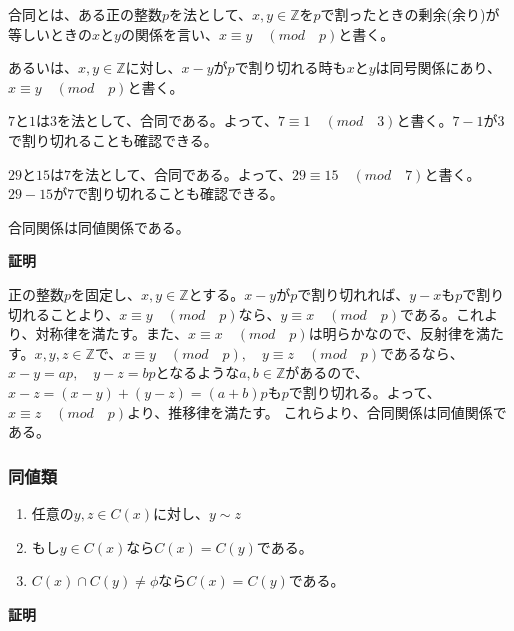 \documentclass[dvipdfmx,autodetect-engine]{jsarticle}
\begin{document}
合同とは、ある正の整数$p$を法として、$x,y \in \mathbb{Z}$を$p$で割ったときの剰余(余り)が等しいときの$x$と$y$の関係を言い、$x \equiv y \quad (mod \quad p)$と書く。

あるいは、$x, y \in \mathbb{Z}$に対し、$x - y$が$p$で割り切れる時も$x$と$y$は同号関係にあり、$x \equiv y \quad (mod \quad p)$と書く。

\exam $7$と$1$は$3$を法として、合同である。よって、$7 \equiv 1 \quad (mod \quad 3)$と書く。$7 - 1$が$3$で割り切れることも確認できる。

\exam $29$と$15$は$7$を法として、合同である。よって、$29 \equiv 15 \quad (mod \quad 7)$と書く。$29 - 15$が$7$で割り切れることも確認できる。

\prop 合同関係は同値関係である。

{\bf 証明}

正の整数$p$を固定し、$x, y \in \mathbb{Z}$とする。$x - y$が$p$で割り切れれば、$y - x$も$p$で割り切れることより、$x \equiv y \quad (mod \quad p)$なら、$y \equiv x \quad (mod \quad p)$である。これより、対称律を満たす。また、$x \equiv x \quad (mod \quad p)$は明らかなので、反射律を満たす。$x, y, z \in \mathbb{Z}$で、$x \equiv y \quad (mod \quad p), \quad y \equiv z \quad (mod \quad p)$であるなら、$x-y = ap,\quad y-z=bp$となるような$a, b \in \mathbb{Z}$があるので、$x - z = (x - y) + (y - z) = (a + b)p$も$p$で割り切れる。よって、$x \equiv z \quad (mod \quad p)$より、推移律を満たす。
これらより、合同関係は同値関係である。

\subsubsection{同値類}

\label{defi:equivClass}

\label{prop:equivClass}

\begin{enumerate}
\renewcommand{\labelenumi}{(\arabic{enumi})}
\item 任意の$y,z \in C(x)$に対し、$y \sim z$
\item もし$y \in C(x)$なら$C(x) = C(y)$である。
\item $C(x) \cap C(y) \neq \phi$なら$C(x) = C(y)$である。
\end{enumerate}

{\bf 証明}
\end{document}
